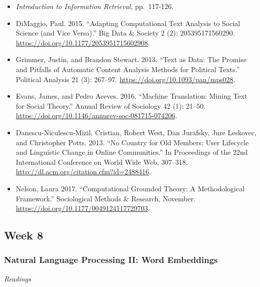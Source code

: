 \documentclass[
  10pt,
]{article}
\providecommand{\tightlist}{%
  \setlength{\itemsep}{0pt}\setlength{\parskip}{0pt}}
\begin{document}
\begin{itemize}
\tightlist
\item
  \emph{Introduction to Information Retrieval}, pp.~117-126.
\item
  DiMaggio, Paul. 2015. ``Adapting Computational Text Analysis to Social
  Science (and Vice Versa).'' Big Data \& Society 2 (2):
  205395171560290. \url{https://doi.org/10.1177/2053951715602908}.
\item
  Grimmer, Justin, and Brandon Stewart. 2013. ``Text as Data: The
  Promise and Pitfalls of Automatic Content Analysis Methods for
  Political Texts.'' Political Analysis 21 (3): 267--97.
  \url{https://doi.org/10.1093/pan/mps028}.
\item
  Evans, James, and Pedro Aceves. 2016. ``Machine Translation: Mining
  Text for Social Theory.'' Annual Review of Sociology 42 (1): 21--50.
  \url{https://doi.org/10.1146/annurev-soc-081715-074206}.
\item
  Danescu-Niculescu-Mizil, Cristian, Robert West, Dan Jurafsky, Jure
  Leskovec, and Christopher Potts. 2013. ``No Country for Old Members:
  User Lifecycle and Linguistic Change in Online Communities.'' In
  Proceedings of the 22nd International Conference on World Wide Web,
  307--318. \url{http://dl.acm.org/citation.cfm?id=2488416}.
\item
  Nelson, Laura 2017. ``Computational Grounded Theory: A Methodological
  Framework.'' Sociological Methods \& Research, November.
  \url{https://doi.org/10.1177/0049124117729703}.
\end{itemize}

\hypertarget{week-8}{%
\subsection{Week 8}\label{week-8}}

\hypertarget{natural-language-processing-ii-word-embeddings}{%
\subsubsection{Natural Language Processing II: Word
Embeddings}\label{natural-language-processing-ii-word-embeddings}}

\emph{Readings}
\end{document}
